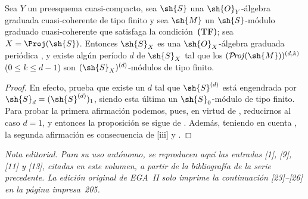 \documentclass[oneside,10pt]{amsart}
\renewcommand{\leq}{\leqslant}
\def\shProj{\mathcal{P}\!\mathit{roj}}
\newcommand{\oldpage}[2][]{\marginnote{\normalfont\footnotesize\textbf{#1}~|~#2}\ignorespaces}
\let\EGAOriginalLabel\label
\renewcommand{\label}[1]{\phantomsection\EGAOriginalLabel{#1}}
\begin{document}
\begin{proposition}[8.14.14]
\label{II.8.14.14}
Sea $Y$ un preesquema cuasi-compacto, sea $\sh{S}$ una $\sh{O}_Y$-álgebra graduada cuasi-coherente de tipo finito y sea $\sh{M}$ un $\sh{S}$-módulo graduado cuasi-coherente que satisfaga la condición~\textup{\textbf{(TF)}};
sea $X=\Proj(\sh{S})$.
Entonces $\sh{S}_X$ es una $\sh{O}_X$-álgebra graduada periódica , y existe
\oldpage[II]{203}
algún período $d$ de $\sh{S}_X$ tal que los $(\shProj(\sh{M}))^{(d,k)}$ ($0\leq k\leq d-1$) son $(\sh{S}_X)^{(d)}$-módulos de tipo finito.
\end{proposition}

\begin{proof}
En efecto,  prueba que existe un $d$ tal que $\sh{S}^{(d)}$ está engendrada por $\sh{S}_d=(\sh{S}^{(d)})_1$, siendo esta última un $\sh{S}_0$-módulo de tipo finito.
Para probar la primera afirmación podemos, pues, en virtud de , reducirnos al caso $d=1$, y entonces la proposición se sigue de .
Además, teniendo en cuenta , la segunda afirmación es consecuencia de [iii] y .
\end{proof}
\clearpage
{}
{}
\renewcommand{\refname}{Bibliografía}
\noindent\textit{Nota editorial. Para su uso autónomo, se reproducen aquí las entradas [1], [9],
[11] y [13], citadas en este volumen, a partir de la bibliografía de la serie precedente.
La edición original de EGA~II solo imprime la continuación [23]--[26] en la página impresa~205.}
\par\medskip
\end{document}
